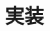 \documentclass[tanilab-enum]{graduate}
\begin{document}

\chapter{実装}\label{chap:implementation}
\end{document}

